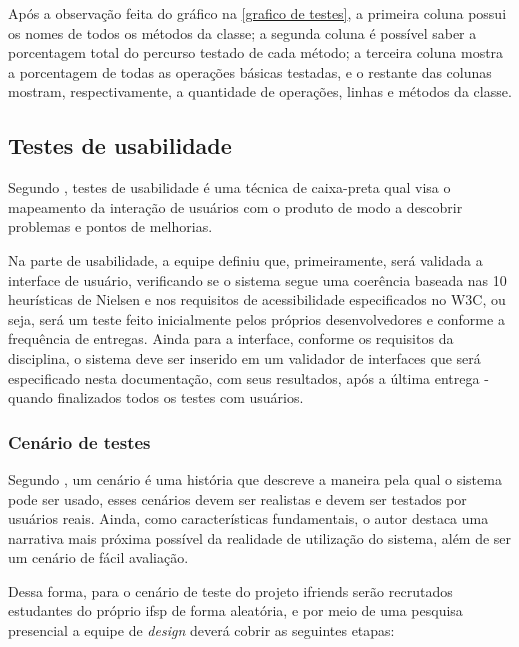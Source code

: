 Após a observação feita do gráfico na \autoref{grafico de testes}, a primeira coluna possui os nomes de todos os métodos da classe; a segunda coluna é possível saber a porcentagem total do percurso testado de cada método; a terceira coluna mostra a porcentagem de todas as operações básicas testadas, e o restante das colunas mostram, respectivamente, a quantidade de operações, linhas e métodos da classe.

\subsection{Testes de usabilidade}
Segundo , testes de usabilidade é uma técnica de caixa-preta qual visa o mapeamento da interação de usuários com o produto de modo a descobrir problemas e pontos de melhorias. 

Na parte de usabilidade, a equipe definiu que, primeiramente, será validada a interface de usuário, verificando se o sistema segue uma coerência baseada nas 10 heurísticas de Nielsen e nos requisitos de acessibilidade especificados no W3C, ou seja, será um teste feito inicialmente pelos próprios desenvolvedores e conforme a frequência de entregas. Ainda para a interface, conforme os requisitos da disciplina,  o sistema deve ser inserido em um validador de interfaces que será especificado nesta documentação, com seus resultados, após a última entrega - quando finalizados todos os testes com usuários.

\subsubsection{Cenário de testes}
Segundo , um cenário é uma história que descreve a maneira pela qual o sistema pode ser usado, esses cenários devem ser realistas e devem ser testados por usuários reais. Ainda, como características fundamentais, o autor  destaca uma narrativa mais próxima possível da realidade de utilização do sistema, além de ser um cenário de fácil avaliação. 

Dessa forma, para o cenário de teste do projeto \gls{ifriends} serão recrutados estudantes do próprio \acs{ifsp} de forma aleatória, e por meio de uma pesquisa presencial a equipe de \textit{design} deverá cobrir as seguintes etapas: 

